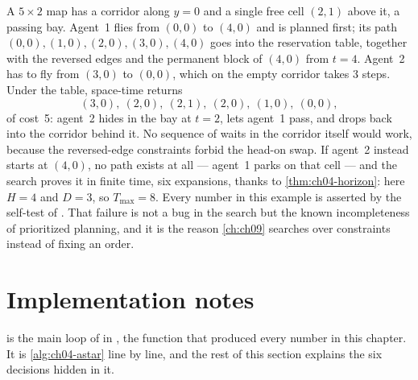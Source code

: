 \begin{example}
\label{ex:ch04-corridor}
A $5 \times 2$ map has a corridor along $y = 0$ and a single free cell $(2, 1)$
above it, a passing bay. Agent~1 flies from $(0,0)$ to $(4,0)$ and is planned
first; its path $(0,0), (1,0), (2,0), (3,0), (4,0)$ goes into the reservation
table, together with the reversed edges and the permanent block of $(4,0)$ from
$t = 4$. Agent~2 has to fly from $(3,0)$ to $(0,0)$, which on the empty corridor takes
3 steps. Under the table, space-time \astar returns
\[
  (3,0),\ (2,0),\ (2,1),\ (2,0),\ (1,0),\ (0,0),
\]
of cost~5: agent~2 hides in the bay at $t = 2$, lets agent~1 pass, and drops
back into the corridor behind it. No sequence of waits in the corridor itself
would work, because the reversed-edge constraints forbid the head-on swap. If
agent~2 instead starts at $(4,0)$, no path exists at all --- agent~1 parks on
that cell --- and the search proves it in finite time, six expansions, thanks to
\cref{thm:ch04-horizon}: here $H = 4$ and $D = 3$, so $T_{\max} = 8$. Every
number in this example is asserted by the self-test of
. That failure is not a bug in the search but the known
incompleteness of prioritized planning, and it is the reason \cref{ch:ch09}
searches over constraints instead of fixing an order.
\end{example}

\section{Implementation notes}
\label{sec:ch04-implementation}

 is the main loop of  in
, the function that produced every number in this
chapter. It is \cref{alg:ch04-astar} line by line, and the rest of this section
explains the six decisions hidden in it.

